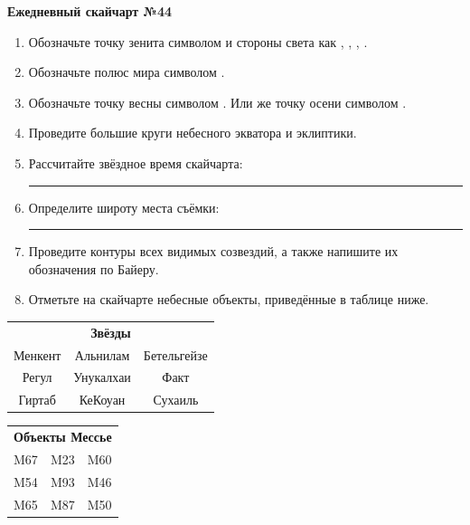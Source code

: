\documentclass{./SAS-class-skygen}
\begin{document}
    
    
    
	\begin{center}
		\large\textbf{Ежедневный скайчарт №44}
	\end{center}

	\begin{enumerate}
		\item Обозначьте точку зенита символом  и стороны света как , , , .
		\item Обозначьте полюс мира символом .
		\item Обозначьте точку весны символом \Aries. Или же точку осени символом \Libra.
		\item Проведите большие круги небесного экватора и эклиптики.
		\item Рассчитайте звёздное время скайчарта: \rule{2cm}{0.4pt}
		\item Определите широту места съёмки: \rule{2cm}{0.4pt}
		\item Проведите контуры всех видимых созвездий, а также напишите их обозначения по Байеру.
		\item Отметьте на скайчарте небесные объекты, приведённые в таблице ниже.
	\end{enumerate}
	
    \vspace{0.5cm}

    \begin{table}[h!]
    \centering
    \begin{tabular}{ccc}
    \multicolumn{3}{c}{\textbf{Звёзды}} \\ Менкент & Альнилам & Бетельгейзе \\
Регул & Унукалхаи & Факт \\
Гиртаб & КеКоуан & Сухаиль \\

\end{tabular}
    \hfill
    \begin{tabular}{ccc}
    \multicolumn{3}{c}{\textbf{Объекты Мессье}} \\ M67 & M23 & M60 \\
M54 & M93 & M46 \\
M65 & M87 & M50 \\

\end{tabular}
    \end{table}
	
\end{document}
